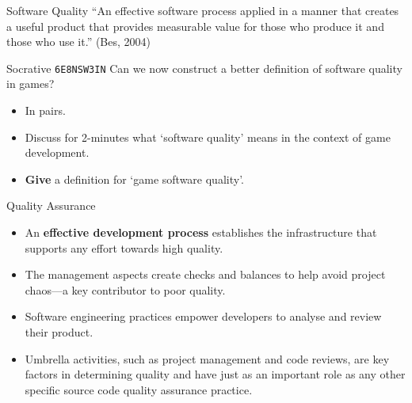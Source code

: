 \begin{frame}[fragile]{Software Quality}
	``An effective software process applied in a manner that creates a useful product that provides measurable
	value for those who produce it and those who use it.''
	\vspace{2ex}
	(Bes, 2004)
\end{frame}

\begin{frame}[fragile]{Socrative \texttt{6E8NSW3IN}}
	Can we now construct a better definition of software quality in games?
	
	\begin{itemize}
		\item In pairs.
		\item Discuss for 2-minutes what `software quality' means in the context of game development.
		\item \textbf{Give} a definition for `game software quality'. 
	\end{itemize}
\end{frame}

\begin{frame}[fragile]{Quality Assurance}
	\begin{itemize}
		\item An \textbf{effective development process} establishes the infrastructure that supports any effort towards high quality. 
		\item The management aspects create checks and balances to help avoid project chaos---a key contributor to poor quality.
		\item Software engineering practices empower developers to analyse and review their product.
		\item Umbrella activities, such as project management and code reviews, are key factors in determining quality and have just as an
		important role as any other specific source code quality assurance practice.
	\end{itemize}
\end{frame}

